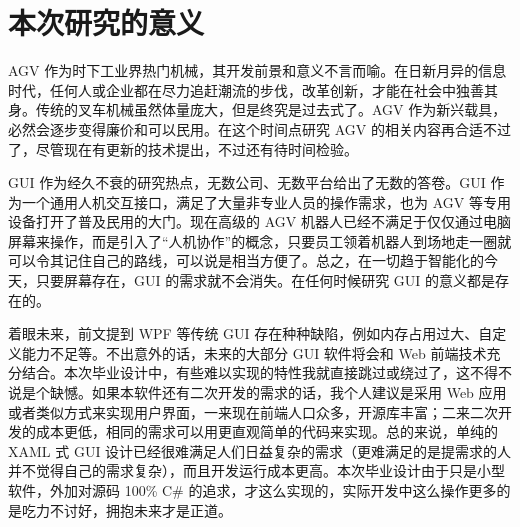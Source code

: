 \section{本次研究的意义}

AGV 作为时下工业界热门机械，其开发前景和意义不言而喻。在日新月异的信息时代，任何人或企业都在尽力追赶潮流的步伐，改革创新，才能在社会中独善其身。传统的叉车机械虽然体量庞大，但是终究是过去式了。AGV 作为新兴载具，必然会逐步变得廉价和可以民用。在这个时间点研究 AGV 的相关内容再合适不过了，尽管现在有更新的技术提出，不过还有待时间检验。

GUI 作为经久不衰的研究热点，无数公司、无数平台给出了无数的答卷。GUI 作为一个通用人机交互接口，满足了大量非专业人员的操作需求，也为 AGV 等专用设备打开了普及民用的大门。现在高级的 AGV 机器人已经不满足于仅仅通过电脑屏幕来操作，而是引入了``人机协作''的概念，只要员工领着机器人到场地走一圈就可以令其记住自己的路线，可以说是相当方便了。总之，在一切趋于智能化的今天，只要屏幕存在，GUI 的需求就不会消失。在任何时候研究 GUI 的意义都是存在的。

着眼未来，前文提到 WPF 等传统 GUI 存在种种缺陷，例如内存占用过大、自定义能力不足等。不出意外的话，未来的大部分 GUI 软件将会和 Web 前端技术充分结合。本次毕业设计中，有些难以实现的特性我就直接跳过或绕过了，这不得不说是个缺憾。如果本软件还有二次开发的需求的话，我个人建议是采用 Web 应用或者类似方式来实现用户界面，一来现在前端人口众多，开源库丰富；二来二次开发的成本更低，相同的需求可以用更直观简单的代码来实现。总的来说，单纯的 XAML 式 GUI 设计已经很难满足人们日益复杂的需求（更难满足的是提需求的人并不觉得自己的需求复杂），而且开发运行成本更高。本次毕业设计由于只是小型软件，外加对源码 100\% C\# 的追求，才这么实现的，实际开发中这么操作更多的是吃力不讨好，拥抱未来才是正道。
